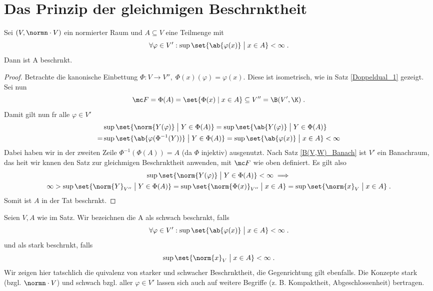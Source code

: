 \section{Das Prinzip der gleichm\as \s igen Beschr\as nktheit}
\begin{theorem}
	Sei \((V,\normn\cdot V)\) ein normierter Raum und \(A\subseteq V\) eine Teilmenge mit
	\[\forall \varphi \in V': \sup\set{\ab{\varphi(x)} \;\big\vert\; x\in A}<\infty\;.\]
	Dann ist A beschr\as nkt.
\end{theorem}
\begin{proof}
	Betrachte die kanonische Einbettung \(\Phi: V \to V'',\; \Phi(x)(\varphi) = \varphi(x)\). Diese ist isometrisch, wie in Satz \ref{Doppeldual_1} gezeigt. Sei nun 
	\[\mc F = \Phi(A) = \set{\Phi(x)\;\vert\;x \in A} \subseteq V'' = \B(V',\K)\;.\]
	Damit gilt nun  f\us r alle \(\varphi\in V'\)
	\begin{align*}
		& \sup \set{\norm{Y(\varphi)} \;\big\vert\; Y\in \Phi(A)} = \sup \set{\ab{Y(\varphi)} \;\big\vert\; Y\in \Phi(A)} \\
		 =& \sup \set{\ab{\varphi(\Phi^{-1}(Y))} \;\big\vert\; Y\in \Phi(A)} =  \sup \set{\ab{\varphi(x)} \;\big\vert\; x\in A} < \infty
	\end{align*}
	Dabei haben wir in der zweiten Zeile \(\Phi^{-1}(\Phi(A)) = A\) (da \(\Phi\) injektiv) ausgenutzt. Nach Satz \ref{B(V,W)_Banach} ist \(V'\) ein Banachraum, das hei\s t wir k\os nnen den Satz zur gleichm\as \s igen Beschr\as nktheit anwenden, mit \(\mc F \) wie oben definiert. Es gilt also
	\begin{multline*} 
		\sup \set{\norm{Y(\varphi)} \;\big\vert\; Y\in \Phi(A)} <\infty\implies  \\
		\infty > \sup \set{\norm{Y}_{V''} \;\big\vert\; Y\in \Phi(A)} =  \sup \set{\norm{\Phi(x)}_{V''} \;\big\vert\; x\in A} =  \sup \set{\norm{x}_V \;\big\vert\; x\in A}\;.
	\end{multline*}
	Somit ist \(A\) in der Tat beschr\as nkt.
\end{proof}
\begin{rem}
	Seien \(V, A\) wie im Satz. Wir bezeichnen die A als schwach beschr\as nkt, falls
	\[\forall \varphi \in V': \sup\set{\ab{\varphi(x)} \;\big\vert\; x\in A}<\infty\;.\]
	und als stark beschr\as nkt, falls
	\[\sup \set{\norm{x}_V \;\big\vert\; x\in A} < \infty\;.\]
	Wir zeigen hier tats\as chlich die \As quivalenz von starker und schwacher Beschr\as nktheit, die Gegenrichtung gilt ebenfalls. Die Konzepte stark (bzgl. \(\normn\cdot V\)) und schwach bzgl. aller \(\varphi\in V'\) lassen sich auch auf weitere Begriffe (z. B. Kompaktheit, Abgeschlossenheit) \us bertragen.
\end{rem}

